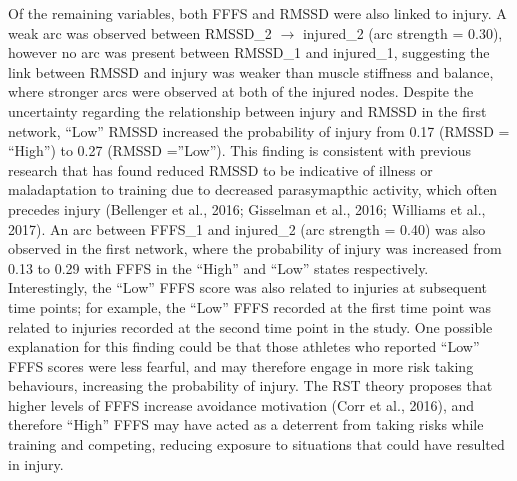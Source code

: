 \documentclass[
  english,
  man,floatsintext]{apa6}
\begin{document}
Of the remaining variables, both FFFS and RMSSD were also linked to injury.
A weak arc was observed between RMSSD\_2 \(\rightarrow\) injured\_2 (arc strength = 0.30), however no arc was present between RMSSD\_1 and injured\_1, suggesting the link between RMSSD and injury was weaker than muscle stiffness and balance, where stronger arcs were observed at both of the injured nodes.
Despite the uncertainty regarding the relationship between injury and RMSSD in the first network, \enquote{Low} RMSSD increased the probability of injury from 0.17 (RMSSD = \enquote{High'') to 0.27 (RMSSD =}Low'').
This finding is consistent with previous research that has found reduced RMSSD to be indicative of illness or maladaptation to training due to decreased parasymapthic activity, which often precedes injury (Bellenger et al., 2016; Gisselman et al., 2016; Williams et al., 2017).
An arc between FFFS\_1 and injured\_2 (arc strength = 0.40) was also observed in the first network, where the probability of injury was increased from 0.13 to 0.29 with FFFS in the \enquote{High} and \enquote{Low} states respectively.
Interestingly, the \enquote{Low} FFFS score was also related to injuries at subsequent time points; for example, the \enquote{Low} FFFS recorded at the first time point was related to injuries recorded at the second time point in the study.
One possible explanation for this finding could be that those athletes who reported \enquote{Low} FFFS scores were less fearful, and may therefore engage in more risk taking behaviours, increasing the probability of injury.
The RST theory proposes that higher levels of FFFS increase avoidance motivation (Corr et al., 2016), and therefore \enquote{High} FFFS may have acted as a deterrent from taking risks while training and competing, reducing exposure to situations that could have resulted in injury.
\end{document}
